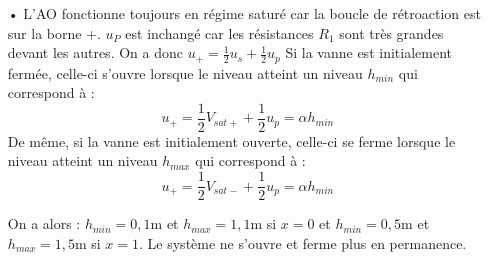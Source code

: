 \documentclass{report}
\begin{document}
\begin{itemize}
	\item[•] L'AO fonctionne toujours en régime saturé car la boucle de rétroaction est sur la borne +. $u_P$ est inchangé car les résistances $R_1$ sont très grandes devant les autres. On a donc $u_+=\frac{1}{2}u_s +\frac{1}{2}u_p$
	Si la vanne est initialement fermée, celle-ci s'ouvre lorsque le niveau atteint un niveau $h_{min}$ qui correspond à :
	\begin{equation}
		u_+=\frac{1}{2}V_{sat+} +\frac{1}{2}u_p=\alpha h_{min}
	\end{equation}
De même, si la vanne est initialement ouverte, celle-ci se ferme lorsque le niveau atteint un niveau $h_{max}$ qui correspond à :
	\begin{equation}
		u_+=\frac{1}{2}V_{sat-} +\frac{1}{2}u_p=\alpha h_{min}
	\end{equation}
	
	On a alors : $h_{min}=0,1$m et $h_{max}=1,1$m si $x=0$ et $h_{min}=0,5$m et $h_{max}=1,5$m si $x=1$. Le système ne s'ouvre et ferme plus en permanence.
\end{itemize}
\end{document}
